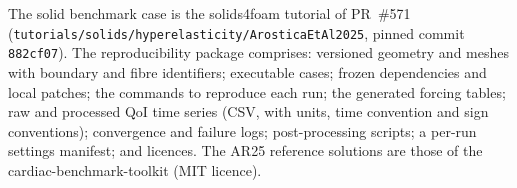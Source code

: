 The solid benchmark case is the solids4foam tutorial of PR~\#571
\citep{s4fPR571} (\texttt{tutorials/solids/hyperelasticity/ArosticaEtAl2025},
pinned commit \texttt{882cf07}).  The reproducibility package comprises: versioned
geometry and meshes with boundary and fibre identifiers; executable cases;
frozen dependencies and local patches; the commands to reproduce each run;
the generated forcing tables; raw and processed QoI time series (CSV, with
units, time convention and sign conventions); convergence and failure logs;
post-processing scripts; a per-run settings manifest; and licences. The
AR25 reference solutions are those of the cardiac-benchmark-toolkit (MIT
licence).
